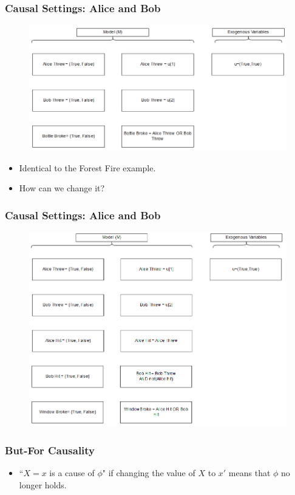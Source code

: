 \documentclass{beamer}
\theoremstyle{plain}
\theoremstyle{definition}
\begin{document}
\begin{frame}
\frametitle{Causal Settings: Alice and Bob}
\begin{figure}
\includegraphics[scale=0.4]{aliceBobModel1}
\end{figure}
\begin{itemize}
\item Identical to the Forest Fire example.
\item How can we change it?
\end{itemize}
\end{frame}

\begin{frame}
\frametitle{Causal Settings: Alice and Bob}
\begin{figure}
\includegraphics[scale=0.4]{aliceBobModel2}
\end{figure}
\end{frame}



\begin{frame}
\frametitle{But-For Causality}
\begin{itemize}
\item ``$X=x$ is a cause of $\phi$" if changing the value of $X$ to $x'$ means that $\phi$ no longer holds.
\end{itemize}
\end{frame}
\end{document}
